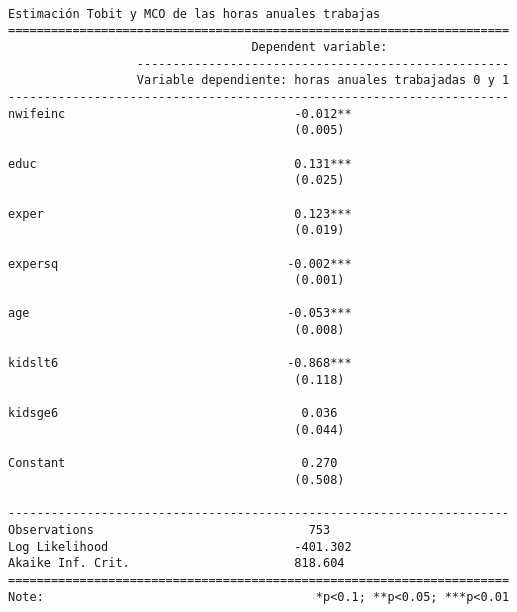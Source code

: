 \documentclass[
  letterpaper,
  DIV=11,
  numbers=noendperiod]{scrreprt}
\begin{document}
\begin{verbatim}

Estimación Tobit y MCO de las horas anuales trabajas
======================================================================
                                  Dependent variable:                 
                  ----------------------------------------------------
                  Variable dependiente: horas anuales trabajadas 0 y 1
----------------------------------------------------------------------
nwifeinc                                -0.012**                      
                                        (0.005)                       
                                                                      
educ                                    0.131***                      
                                        (0.025)                       
                                                                      
exper                                   0.123***                      
                                        (0.019)                       
                                                                      
expersq                                -0.002***                      
                                        (0.001)                       
                                                                      
age                                    -0.053***                      
                                        (0.008)                       
                                                                      
kidslt6                                -0.868***                      
                                        (0.118)                       
                                                                      
kidsge6                                  0.036                        
                                        (0.044)                       
                                                                      
Constant                                 0.270                        
                                        (0.508)                       
                                                                      
----------------------------------------------------------------------
Observations                              753                         
Log Likelihood                          -401.302                      
Akaike Inf. Crit.                       818.604                       
======================================================================
Note:                                      *p<0.1; **p<0.05; ***p<0.01
\end{verbatim}
\end{document}
